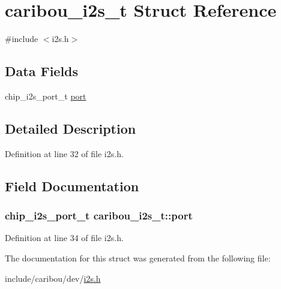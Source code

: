 \hypertarget{structcaribou__i2s__t}{\section{caribou\-\_\-i2s\-\_\-t Struct Reference}
\label{structcaribou__i2s__t}
}


{\ttfamily \#include $<$i2s.\-h$>$}

\subsection*{Data Fields}
\begin{DoxyCompactItemize}
\item 
chip\-\_\-i2s\-\_\-port\-\_\-t \hyperlink{structcaribou__i2s__t_a19ef2c09b1cbef9acbb9092b54243a76}{port}
\end{DoxyCompactItemize}


\subsection{Detailed Description}


Definition at line 32 of file i2s.\-h.



\subsection{Field Documentation}
\hypertarget{structcaribou__i2s__t_a19ef2c09b1cbef9acbb9092b54243a76}{
\subsubsection[{port}]{\setlength{\rightskip}{0pt plus 5cm}chip\-\_\-i2s\-\_\-port\-\_\-t caribou\-\_\-i2s\-\_\-t\-::port}}\label{structcaribou__i2s__t_a19ef2c09b1cbef9acbb9092b54243a76}


Definition at line 34 of file i2s.\-h.



The documentation for this struct was generated from the following file\-:\begin{DoxyCompactItemize}
\item 
include/caribou/dev/\hyperlink{i2s_8h}{i2s.\-h}\end{DoxyCompactItemize}
